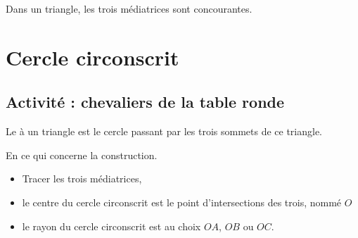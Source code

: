 \begin{propriete}
    Dans un triangle, les trois médiatrices sont concourantes.
\end{propriete}

\begin{center}
   
\end{center}

\section{Cercle circonscrit}

\subsection*{Activité : chevaliers de la table ronde}



\begin{definition}
    Le  à un triangle est le cercle passant par les trois sommets de ce triangle.
\end{definition}

\begin{center}
   
\end{center}

En ce qui concerne la construction.

\begin{center}
   
\end{center}


\begin{itemize}
    \item Tracer les trois médiatrices,
    \item le centre du cercle circonscrit est le point d'intersections des trois, nommé \( O\)
    \item le rayon du cercle circonscrit est au choix \( OA\), \( OB\) ou \( OC\).
\end{itemize}

